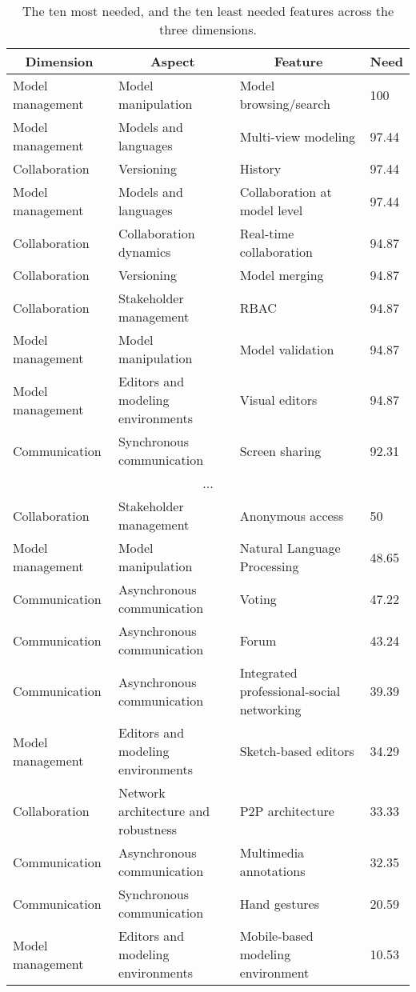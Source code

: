 
  \begin{table*}[]
  \centering
  \notsotiny
  \caption{ The ten most needed, and the ten least needed features across the three dimensions.}
\label{tab:top-bottom-need}
\begin{tabular}{@{}llll@{}}
  \toprule
\multicolumn{1}{c}{\textbf{Dimension}} & \multicolumn{1}{c}{\textbf{Aspect}} & \multicolumn{1}{c}{\textbf{Feature}} & \multicolumn{1}{c}{\textbf{Need}} \\ 

  \midrule
  Model management & Model manipulation & Model browsing/search & 100 \\ 
Model management & Models and languages & Multi-view modeling & 97.44 \\ 
Collaboration & Versioning & History & 97.44 \\ 
Model management & Models and languages & Collaboration at model level & 97.44 \\ 
Collaboration & Collaboration dynamics & Real-time collaboration & 94.87 \\ 
Collaboration & Versioning & Model merging & 94.87 \\ 
Collaboration & Stakeholder management & RBAC & 94.87 \\ 
Model management & Model manipulation & Model validation & 94.87 \\ 
Model management & Editors and modeling environments & Visual editors & 94.87 \\ 
Communication & Synchronous communication & Screen sharing & 92.31 \\ 
\multicolumn{4}{c}{...} \\ 
Collaboration & Stakeholder management & Anonymous access & 50 \\ 
Model management & Model manipulation & Natural Language Processing & 48.65 \\ 
Communication & Asynchronous communication & Voting & 47.22 \\ 
Communication & Asynchronous communication & Forum & 43.24 \\ 
Communication & Asynchronous communication & Integrated professional-social networking & 39.39 \\ 
Model management & Editors and modeling environments & Sketch-based editors & 34.29 \\ 
Collaboration & Network architecture and robustness & P2P architecture & 33.33 \\ 
Communication & Asynchronous communication & Multimedia annotations & 32.35 \\ 
Communication & Synchronous communication & Hand gestures & 20.59 \\ 
Model management & Editors and modeling environments & Mobile-based modeling environment & 10.53 \\ 
\bottomrule
  \end{tabular}%
  \end{table*}